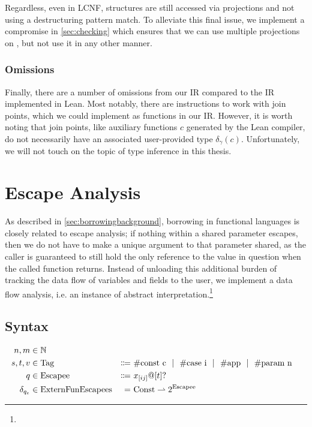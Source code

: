 Regardless, even in LCNF, structures are still accessed via projections and not using a destructuring pattern match. To alleviate this final issue, we implement a compromise in \cref{sec:checking} which ensures that we can use multiple projections on , but not use it in any other manner.

\subsubsection{Omissions}
Finally, there are a number of omissions from our IR compared to the IR implemented in Lean. Most notably, there are instructions to work with join points, which we could implement as functions in our IR. However, it is worth noting that join points, like auxiliary functions $c$ generated by the Lean compiler, do not necessarily have an associated user-provided type $\delta_\gamma(c)$. Unfortunately, we will not touch on the topic of type inference in this thesis.

\newcommand{\Tag}{\mathrm{Tag}}
\newcommand{\Escapee}{\mathrm{Escapee}}
\newcommand{\ExternFunEscapees}{\mathrm{ExternFunEscapees}}

\section{Escape Analysis}\label{sec:escapeanalysis}
As described in \cref{sec:borrowingbackground}, borrowing in functional languages is closely related to escape analysis; if nothing within a shared parameter escapes, then we do not have to make a unique argument to that parameter shared, as the caller is guaranteed to still hold the only reference to the value in question when the called function returns. Instead of unloading this additional burden of tracking the data flow of variables and fields to the user, we implement a data flow analysis, i.e. an instance of abstract interpretation.\footnote{}

\subsection{Syntax}

\begin{alignat*}{3}
  n, m &\in \mathbb{N} \\
  s, t, v &\in \Tag &\Coloneqq&\ \#\textrm{const c} \sep \#\textrm{case i} \sep \#\textrm{app} \sep \#\textrm{param n} \\
  q &\in \Escapee\ &\Coloneqq&\ x_{[ij]} @ [t]? \\
  \delta_{q_e} &\in \ExternFunEscapees &=&\ \Const \rightharpoonup 2^{\Escapee}
\end{alignat*}

